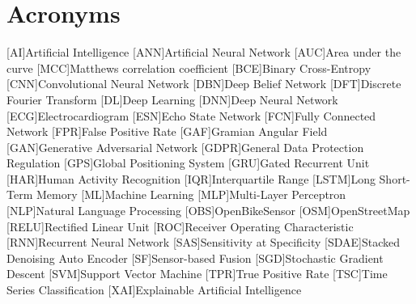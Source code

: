 
\cleardoublepage
\chapter{Acronyms}

\acresetall

\begin{acronym}[Bash]
	[AI]{Artificial Intelligence}
	[ANN]{Artificial Neural Network}
	[AUC]{Area under the curve}
	[MCC]{Matthews correlation coefficient}
	[BCE]{Binary Cross-Entropy}
	[CNN]{Convolutional Neural Network}
	[DBN]{Deep Belief Network}
	[DFT]{Discrete Fourier Transform}
	[DL]{Deep Learning}
	[DNN]{Deep Neural Network}
	[ECG]{Electrocardiogram}
	[ESN]{Echo State Network}
	[FCN]{Fully Connected Network}
	[FPR]{False Positive Rate}
	[GAF]{Gramian Angular Field}
	[GAN]{Generative Adversarial Network}
	[GDPR]{General Data Protection Regulation}
	[GPS]{Global Positioning System}
	[GRU]{Gated Recurrent Unit}
	[HAR]{Human Activity Recognition}
	[IQR]{Interquartile Range}
	[LSTM]{Long Short-Term Memory}	
	[ML]{Machine Learning}
	[MLP]{Multi-Layer Perceptron}
	[NLP]{Natural Language Processing}
	[OBS]{OpenBikeSensor}
	[OSM]{OpenStreetMap}
	[RELU]{Rectified Linear Unit}
	[ROC]{Receiver Operating Characteristic}
	[RNN]{Recurrent Neural Network}
	[SAS]{Sensitivity at Specificity}
	[SDAE]{Stacked Denoising Auto Encoder}
	[SF]{Sensor-based Fusion}
	[SGD]{Stochastic Gradient Descent}
	[SVM]{Support Vector Machine}
	[TPR]{True Positive Rate}
	[TSC]{Time Series Classification}
	[XAI]{Explainable Artificial Intelligence}
\end{acronym}

\acresetall